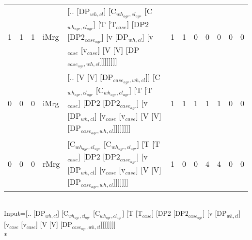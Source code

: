 \begin{tabularx}{\linewidth}{rrrlXrrrrrrr}
   1 &       1 &   1 & iMrg  & [.. [DP$_{wh,cl}$] [C$_{wh_{agr},cl_{agr}}$ [C$_{wh_{agr},cl_{agr}}$] [T [T$_{case}$] [DP2 [DP2$_{case_{agr}}$] [v [DP$_{wh,cl}$] [v$_{case}$ [v$_{case}$] [V [V] [DP$_{case_{agr},wh,cl}$]]]]]]]]                                                                                     &             1 &             1 &                  0 &           0 &           0 &               0 &               0 \\
   0 &       0 &   0 & iMrg  & [.. [V [V] [DP$_{case_{agr},wh,cl}$]] [C$_{wh_{agr},cl_{agr}}$ [C$_{wh_{agr},cl_{agr}}$] [T [T$_{case}$] [DP2 [DP2$_{case_{agr}}$] [v [DP$_{wh,cl}$] [v$_{case}$ [v$_{case}$] [V [V] [DP$_{case_{agr},wh,cl}$]]]]]]]]                                                                    &             1 &             1 &                  1 &           1 &           1 &               0 &               0 \\
   0 &       0 &   0 & rMrg  & [C$_{wh_{agr},cl_{agr}}$ [C$_{wh_{agr},cl_{agr}}$] [T [T$_{case}$] [DP2 [DP2$_{case_{agr}}$] [v [DP$_{wh,cl}$] [v$_{case}$ [v$_{case}$] [V [V] [DP$_{case_{agr},wh,cl}$]]]]]]]                                                                                                     &             1 &             0 &                  0 &           4 &           4 &               0 &               0 \\
\hline
\end{tabularx}\endgroup\\
\begingroup\scriptsize Input=[.. [DP$_{wh,cl}$] [C$_{wh_{agr},cl_{agr}}$ [C$_{wh_{agr},cl_{agr}}$] [T [T$_{case}$] [DP2 [DP2$_{case_{agr}}$] [v [DP$_{wh,cl}$] [v$_{case}$ [v$_{case}$] [V [V] [DP$_{case_{agr},wh,cl}$]]]]]]]]\\*
